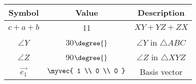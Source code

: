  \begin{tabular}{|c|c|c|} 
  \hline 
  \textbf{Symbol}&\textbf{Value}&\textbf{Description}\\ 
  \hline 
  $c+a+b$ & 11 & $XY+YZ+ZX$ \\ 
  \hline 
 $\angle{Y}$ & 30$\degree{}$ & $\angle{Y}$ in $\triangle$$ABC$\\ 
  \hline 
        $\angle{Z}$ & 90$\degree{}$ & $\angle{Z}$ in $\triangle$$XYZ$ \\
   
  \hline  
 $\vec{e_1}$ & $\myvec{ 
   1 \\
   0 \\
   0 
   }$ & Basis vector\\ 
 \hline
 \end{tabular}\\	
